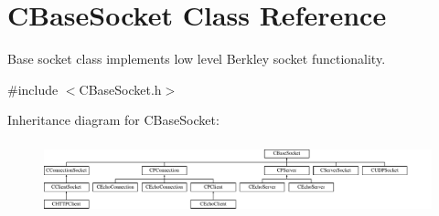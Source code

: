 \hypertarget{class_c_base_socket}{\section{\-C\-Base\-Socket \-Class \-Reference}
\label{class_c_base_socket}
}


\-Base socket class implements low level \-Berkley socket functionality.  




{\ttfamily \#include $<$\-C\-Base\-Socket.\-h$>$}

\-Inheritance diagram for \-C\-Base\-Socket\-:\begin{figure}[H]
\begin{center}
\leavevmode
\includegraphics[height=2.137404cm]{class_c_base_socket}
\end{center}
\end{figure}
